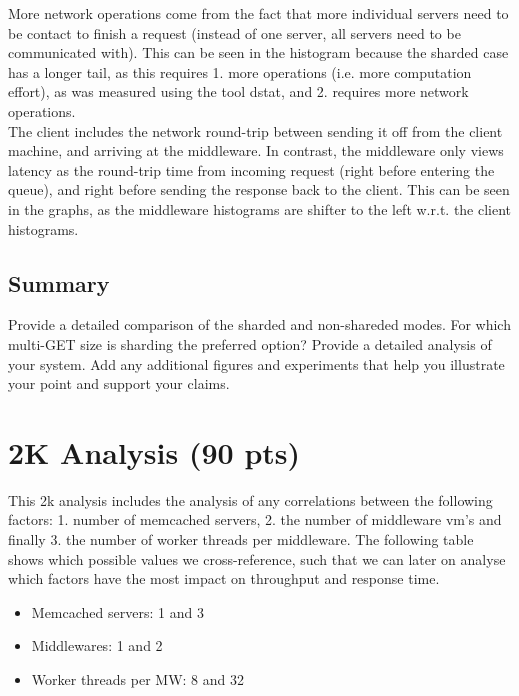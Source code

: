 \documentclass[11pt,a4paper]{article}
\begin{document}

More network operations come from the fact that more individual servers need to be contact to finish a request (instead of one server, all servers need to be communicated with).
This can be seen in the histogram because the sharded case has a longer tail, as this requires 1. more operations (i.e. more computation effort), as was measured using the tool dstat, and 2. requires more network operations. \\

The client includes the network round-trip between sending it off from the client machine, and arriving at the middleware.
In contrast, the middleware only views latency as the round-trip time from incoming request (right before entering the queue), and right before sending the response back to the client.
This can be seen in the graphs, as the middleware histograms are shifter to the left w.r.t. the client histograms.


\subsection{Summary}

Provide a detailed comparison of the sharded and non-shareded modes. For which multi-GET size is sharding the preferred option? Provide a detailed analysis of your system. Add any additional figures and experiments that help you illustrate your point and support your claims.

\section{2K Analysis (90 pts)}

This 2k analysis includes the analysis of any correlations between the following factors: 1. number of memcached servers, 2. the number of middleware vm's and finally 3. the number of worker threads per middleware.
The following table shows which possible values we cross-reference, such that we can later on analyse which factors have the most impact on throughput and response time.

\begin{itemize}
		
	\item Memcached servers: 1 and 3
	\item Middlewares: 1 and 2
	\item Worker threads per MW: 8 and 32
	      	      
\end{itemize}
\end{document}
